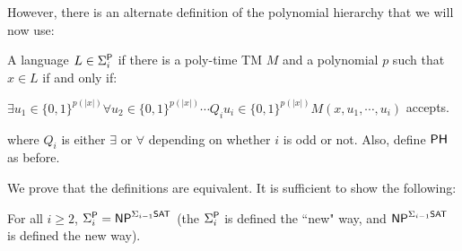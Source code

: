 However, there is an alternate definition of the polynomial hierarchy that we will now use:
\begin{definition}
A language $L \in \Sigma_i^\P$ if there is a poly-time TM $M$ and a polynomial $p$ such that $x \in L$ if and only if:
\begin{center}
$\exists u_1 \in \{0, 1\}^{p(|x|)} \forall u_2 \in \{0, 1\}^{p(|x|)} \cdots Q_iu_i \in \{0, 1\}^{p(|x|)} M(x, u_1, \cdots, u_i)$ accepts.
\end{center}
where $Q_i$ is either $\exists$ or $\forall$ depending on whether $i$ is odd or not. Also, define $\PH$ as before.
\end{definition}

We prove that the definitions are equivalent. It is sufficient to show the following:

\begin{theorem}
For all $i \ge 2$, $\Sigma_i^\P = \NP^{\Sigma_{i-1}\SAT}$ (the $\Sigma_i^\P$ is defined the ``new" way, and $\NP^{\Sigma_{i-1}\SAT}$ is defined the new way).
\end{theorem}

